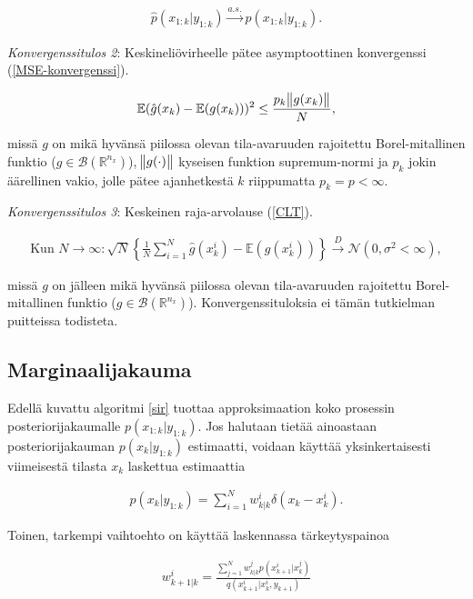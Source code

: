 \documentclass[
  12pt,
  a4paper, twoside]{book}
\begin{document}
\begin{align}\label{jakaumakonvergenssi}
\hat{p}(x_{1:k}|y_{1:k}) \xrightarrow{a.s.} p(x_{1:k}|y_{1:k}).
\end{align}

\textit{Konvergenssitulos 2}: Keskineliövirheelle pätee asymptoottinen konvergenssi (\ref{MSE-konvergenssi}).

\begin{align}\label{MSE-konvergenssi}
\mathbb{E}(\hat{g}(x_k)-\mathbb{E}(g(x_k)))^2\leq\frac{p_k\norm{g(x_k)}}{N},
\end{align}

\noindent missä \(g\) on mikä hyvänsä piilossa olevan tila-avaruuden rajoitettu Borel-mitallinen funktio (\(g \in \mathcal{B}(\mathbb{R}^{n_x})\)), \(\norm{g(\cdot)}\) kyseisen funktion supremum-normi ja \(p_k\) jokin äärellinen vakio, jolle pätee ajanhetkestä \(k\) riippumatta \(p_k=p<\infty\).

\textit{Konvergenssitulos 3}: Keskeinen raja-arvolause (\ref{CLT}).

\begin{align}\label{CLT}
\text{Kun } N \to \infty: \sqrt{N} \left\{ \frac{1}{N} \sum_{i=1}^N \hat{g}(x_k^i) -\mathbb{E}(g(x_k^i)) \right\} \xrightarrow{D} \mathcal{N}(0,\sigma^2 < \infty),
\end{align}

missä \(g\) on jälleen mikä hyvänsä piilossa olevan tila-avaruuden rajoitettu Borel-mitallinen funktio (\(g \in \mathcal{B}(\mathbb{R}^{n_x})\)). Konvergenssituloksia ei tämän tutkielman puitteissa todisteta.

\subsection{Marginaalijakauma}

Edellä kuvattu algoritmi \ref{sir} tuottaa approksimaation koko prosessin posteriorijakaumalle \(p(x_{1:k}|y_{1:k})\). Jos halutaan tietää ainoastaan posteriorijakauman \(p(x_k|y_{1:k})\) estimaatti, voidaan käyttää yksinkertaisesti viimeisestä tilasta \(x_k\) laskettua estimaattia

\begin{align}
\hat{p}(x_{k}|y_{1:k})=\sum_{i=1}^{N}w_{k|k}^i \delta(x_{k}-x_{k}^i).
\end{align}

Toinen, tarkempi vaihtoehto on käyttää laskennassa tärkeytyspainoa

\begin{align}\label{marginaalitarkeytys}
w_{k+1|k}^i=\frac{\sum_{j=1}^{N}w_{k|k}^jp(x_{k+1}^i|x_k^j)}{q(x_{k+1}^i|x_k^i,y_{k+1})}
\end{align}
\end{document}
